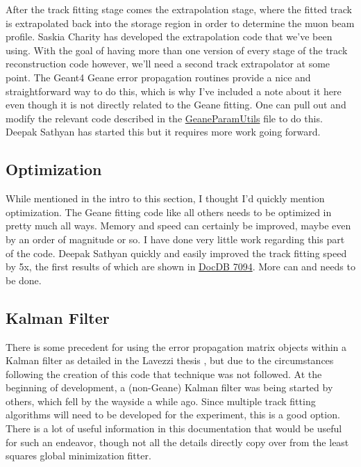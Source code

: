 		After the track fitting stage comes the extrapolation stage, where the fitted track is extrapolated back into the storage region in order to determine the muon beam profile. Saskia Charity has developed the extrapolation code that we've been using. With the goal of having more than one version of every stage of the track reconstruction code however, we'll need a second track extrapolator at some point. The Geant4 Geane error propagation routines provide a nice and straightforward way to do this, which is why I've included a note about it here even though it is not directly related to the Geane fitting. One can pull out and modify the relevant code described in the \hyperref[sec:GeaneParamUtils]{GeaneParamUtils} file to do this. Deepak Sathyan has started this but it requires more work going forward.

	\subsection{Optimization}

		While mentioned in the intro to this section, I thought I'd quickly mention optimization. The Geane fitting code like all others needs to be optimized in pretty much all ways. Memory and speed can certainly be improved, maybe even by an order of magnitude or so. I have done very little work regarding this part of the code. Deepak Sathyan quickly and easily improved the track fitting speed by 5x, the first results of which are shown in \href{https://gm2-docdb.fnal.gov/cgi-bin/private/ShowDocument?docid=7094}{DocDB 7094}. More can and needs to be done.

	\subsection{Kalman Filter}

    	There is some precedent for using the error propagation matrix objects within a Kalman filter as detailed in the Lavezzi thesis \cite{Lavezzi}, but due to the circumstances following the creation of this code that technique was not followed. At the beginning of development, a (non-Geane) Kalman filter was being started by others, which fell by the wayside a while ago. Since multiple track fitting algorithms will need to be developed for the experiment, this is a good option. There is a lot of useful information in this documentation that would be useful for such an endeavor, though not all the details directly copy over from the least squares global minimization fitter.

